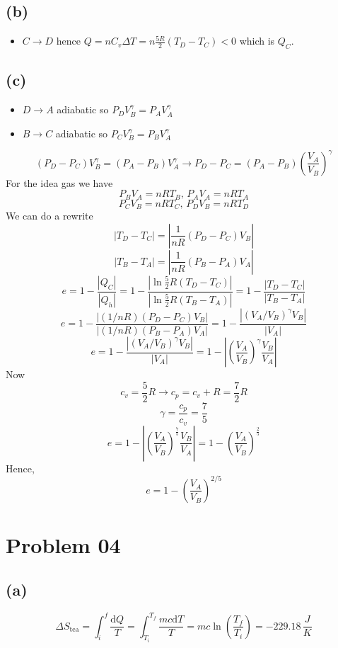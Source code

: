 \documentclass[letter]{article}
\begin{document}
\subsection*{(b)} 
\begin{itemize}
	\item $C \to D$ hence $Q = n C_v \Delta T = n \frac{5 R}{2} (T_D - T_C) < 0 $ which is $Q_C$. 
\end{itemize}

\subsection*{(c)} 
\begin{itemize}
	\item $D \to A$ adiabatic so $P_D V_B^{\gamma} = P_A V_A ^{\gamma}$ 
	\item $B \to C$ adiabatic so $P_C V_B^{\gamma} = P_B V_A ^{\gamma}$ 
\end{itemize}
\[
	(P_D - P_C ) V_B^{\gamma} = (P_A - P_B) V_A^{\gamma} \to P_D - P_C = \left(P_A - P_B\right) 
	\left(\frac{V_A}{V_B}\right)^{\gamma}
\] 
For the idea gas we have 
\[
P_B V_A = n R T_B, \, P_A V_A = n R T_A 
\]
\[
P_C V_B = n R T_C, \, P_D V_B = n R T_D  
\]
We can do a rewrite 
\[
| T_D - T_C | = \left| \frac{1}{n R} (P_D - P_C) V_B \right|
\] 
\[
| T_B - T_A | = \left| \frac{1}{nR} (P_B - P_A) V_A \right|
\] 
\[
e = 1 - \frac{ | Q_C | }{| Q_h |} = 1 - \frac{| \ln \frac{5}{2} R (T_D - T_C) | }{| \ln \frac{5}{2} R (T_B - T_A) | } = 1- \frac{|T_D - T_C |}{|T_B - T_A|} 
\]
\[
e = 1 - \frac{ | (1 / nR) (P_D - P_C) V_B |  }{ | (1 / n R) (P_B- P_A) V_A | } = 
1 - \frac{ | ( V_A / V_B )^\gamma V_B| }{| V_A| }
\]
\[
e = 1 - \frac{ \left| \left( V_A / V_B \right)^{\gamma} V_B \right|}{| V_A| } = 1 - \left | 
\left(\frac{V_A}{V_B} \right)^{\gamma} \frac{V_B}{V_A} \right| 
\]
Now 
\[
c_v = \frac{5}{2} R \to c_p = c_v + R = \frac{7}{2} R
\] 
\[
\gamma = \frac{c_p}{c_v} = \frac{7}{5}
\] 
\[
e = 1 - \left|
\left(\frac{V_A}{V_B} \right)^{\frac{7}{5}} \frac{V_B}{V_A} \right|   = 1 - \left(\frac{V_A}{V_B}\right)^{\frac{2}{5}}
\]
Hence, 
\[
\boxed{
e = 1 - \left(\frac{V_A}{V_B}\right)^{2 / 5}
}
\] 


\section*{Problem 04} 
\subsection*{(a)} 
\[
	\Delta S _\text{tea} = \int_{i}^{f}  \frac{\mathrm{d} Q}{T} = 
	\int_{T_i}^{T_f}  \frac{m c \mathrm{d} T}{T} = m c \ln \left(\frac{T_f}{T_i}\right)  
	= - 229.18 \, \frac{J}{K}
\]
\end{document}
